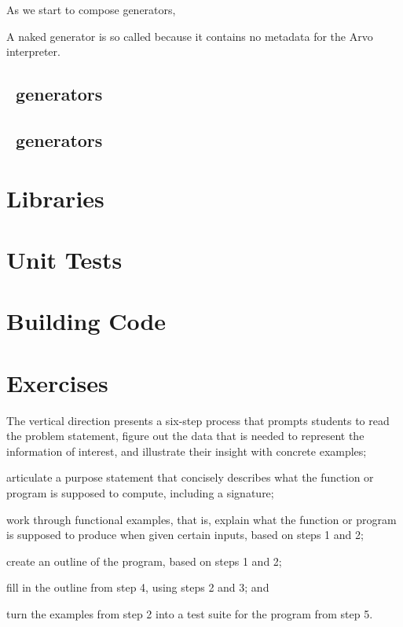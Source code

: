 As we start to compose generators,

A naked generator is so called because it contains no metadata for the Arvo interpreter.

\subsection{\say~generators}

\subsection{\ask~generators}

\section{Libraries}

\section{Unit Tests}

\section{Building Code}

\section{Exercises}

The vertical direction presents a six-step process that prompts students to
read the problem statement, figure out the data that is needed to represent the information of interest, and illustrate their insight with concrete examples;

articulate a purpose statement that concisely describes what the function or program is supposed to compute, including a signature;

work through functional examples, that is, explain what the function or program is supposed to produce when given certain inputs, based on steps 1 and 2;

create an outline of the program, based on steps 1 and 2;

fill in the outline from step 4, using steps 2 and 3; and

turn the examples from step 2 into a test suite for the program from step 5.
